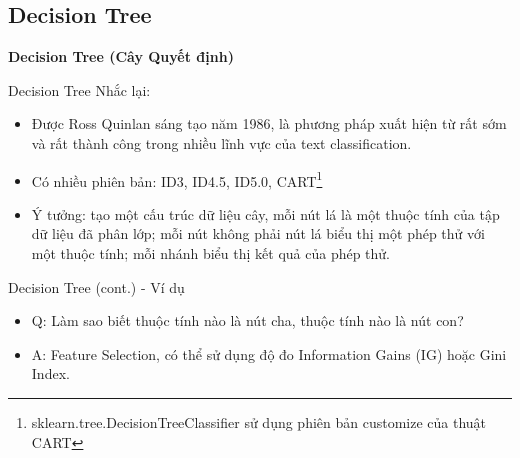 \documentclass[aspectratio=169,xcolor=dvipsnames]{beamer}
\begin{document}
\subsection{Decision Tree}

\begin{frame}
	\Huge{\centerline{\textbf{Decision Tree (Cây Quyết định)}}}
\end{frame}

\begin{frame}{Decision Tree}
Nhắc lại:
\begin{itemize}
\item Được Ross Quinlan sáng tạo năm 1986\cite{DBLP:journals/ml/Quinlan86}, là phương pháp xuất hiện từ rất sớm và rất thành công trong nhiều lĩnh vực của text classification.
\item Có nhiều phiên bản: ID3, ID4.5, ID5.0, CART\footnote{sklearn.tree.DecisionTreeClassifier sử dụng phiên bản customize của thuật CART}
\item Ý tưởng: tạo một cấu trúc dữ liệu cây, mỗi nút lá là một thuộc tính của tập dữ liệu đã phân lớp; mỗi nút không phải nút lá biểu thị một phép thử với một thuộc tính; mỗi nhánh biểu thị kết quả của phép thử.
\end{itemize}
\end{frame}

\begin{frame}{Decision Tree (cont.) - Ví dụ}

\begin{itemize}
	\item Q: Làm sao biết thuộc tính nào là nút cha, thuộc tính nào là nút con?
	\item A: Feature Selection, có thể sử dụng độ đo Information Gains (IG) hoặc Gini Index.
\end{itemize}
\end{frame}
\end{document}
